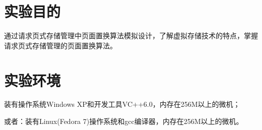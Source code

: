 \documentclass[c5size,a4paper,nofonts]{ctexart}
\begin{document}

\setcounter{part}{4}


\iffalse
\section{实验目的}
通过请求页式存储管理中页面置换算法模拟设计，了解虚拟存储技术的特点，掌握请求页式存储管理的页面置换算法。

\section{实验环境}
装有操作系统Windows XP和开发工具VC++6.0，内存在256M以上的微机；

或者：装有Linux(Fedora 7)操作系统和gcc编译器，内存在256M以上的微机。
\end{document}
